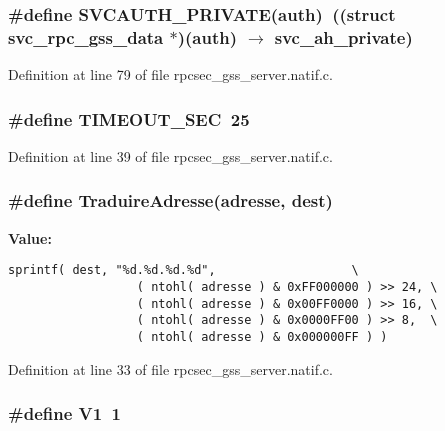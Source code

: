 \subsubsection{\setlength{\rightskip}{0pt plus 5cm}\#define SVCAUTH\_\-PRIVATE(auth)\ ((struct svc\_\-rpc\_\-gss\_\-data $\ast$)(auth) $\rightarrow$ svc\_\-ah\_\-private)}\label{rpcsec__gss__server_8natif_8c_a11}




Definition at line 79 of file rpcsec\_\-gss\_\-server.natif.c.
\subsubsection{\setlength{\rightskip}{0pt plus 5cm}\#define TIMEOUT\_\-SEC\ 25}\label{rpcsec__gss__server_8natif_8c_a2}




Definition at line 39 of file rpcsec\_\-gss\_\-server.natif.c.
\subsubsection{\setlength{\rightskip}{0pt plus 5cm}\#define Traduire\-Adresse(adresse, dest)}\label{rpcsec__gss__server_8natif_8c_a1}


{\bf Value:}

\footnotesize\begin{verbatim}sprintf( dest, "%d.%d.%d.%d",                   \
                  ( ntohl( adresse ) & 0xFF000000 ) >> 24, \
                  ( ntohl( adresse ) & 0x00FF0000 ) >> 16, \
                  ( ntohl( adresse ) & 0x0000FF00 ) >> 8,  \
                  ( ntohl( adresse ) & 0x000000FF ) )
\end{verbatim}\normalsize 


Definition at line 33 of file rpcsec\_\-gss\_\-server.natif.c.
\subsubsection{\setlength{\rightskip}{0pt plus 5cm}\#define V1\ 1}\label{rpcsec__gss__server_8natif_8c_a6}




